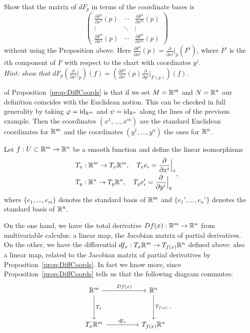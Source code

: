 \begin{exercise}
	Show that the matrix of $d F_p$ in terms of the coordinate bases is
	\begin{equation}
		\begin{pmatrix}
			\frac{\partial F^1}{\partial x^1} (p) & \cdots & \frac{\partial F^1}{\partial x^m} (p) \\
			\vdots                                & \ddots & \vdots                                \\
			\frac{\partial F^n}{\partial x^1} (p) & \cdots & \frac{\partial F^n}{\partial x^m} (p)
		\end{pmatrix}
	\end{equation}
	without using the Proposition above. Here $\frac{\partial F^i}{\partial x^j} (p) = \frac{\partial}{\partial x^j}\big|_p (F^i)$, where $F^i$ is the $i$th component of $F$ with respect to the chart with coordinates $y^j$.\\
	\textit{\small Hint: show that $d F_p \left(\frac{\partial}{\partial x^i}\big|_p\right) (f) = \left(\frac{\partial F^j}{\partial x^i} (p) \frac{\partial}{\partial y^j}\big|_{F(p)}\right) (f)$.}
\end{exercise}

 of Proposition~\ref{prop:DiffCoords} is that if we set $M=\mathbb{R}^m$ and $N=\mathbb{R}^n$ our definition coincides with the Euclidean notion.
This can be checked in full generality by taking $\varphi = \operatorname{id}_{\mathbb{R}^m}$ and $\psi=\operatorname{id}_{\mathbb{R}^n}$ along the lines of the previous example.
Then the coordinates $(x^1,\ldots,x^m)$ are the standard Euclidean coordinates for $\mathbb{R}^m$ and the coordinates $(y^1,\ldots,y^n)$ the ones for $\mathbb{R}^n$.

Let $f:U\subset\mathbb{R}^m\to\mathbb{R}^n$ be a smooth function and define the linear isomorphisms
\begin{equation}\label{def:lin_iso_Tp}
	\begin{split}
		 & T_x : \mathbb{R}^m \to T_x\mathbb{R}^m,\quad T_x e_i = \frac{\partial}{\partial x^i}\Big|_x  \\
		 & T_y : \mathbb{R}^n \to T_y\mathbb{R}^n,\quad T_y e_i' = \frac{\partial}{\partial y^i}\Big|_y
	\end{split},
\end{equation}
where $\{e_1,\ldots,e_m\}$ denotes the standard basis of $\mathbb{R}^m$ and $\{e_1',\ldots,e_n'\}$ denotes the standard basis of $\mathbb{R}^n$.

On the one hand, we have the total derivative $Df(x):\mathbb{R}^m\to\mathbb{R}^n$ from multivariable calculus: a linear map, the Jacobian matrix of partial derivatives.
On the other, we have the differential $df_x : T_x \mathbb{R}^m \to T_{f(x)}\mathbb{R}^n$ defined above: also a linear map, related to the Jacobian matrix of partial derivatives by Proposition~\ref{prop:DiffCoords}.
In fact we know more, since Proposition~\ref{prop:DiffCoords} tells us that the following diagram commutes:
\begin{equation}
	\begin{tikzcd}[row sep=huge, column sep=huge]
		\R^m \arrow[r, "Df(x)"] \arrow[d, "T_x"]
		& \R^n \arrow[d, "T_{f(x)}"] \\
		T_x\R^m \arrow[r, "df_x"]
		& T_{f(x)}\R^n
	\end{tikzcd}.
\end{equation}

